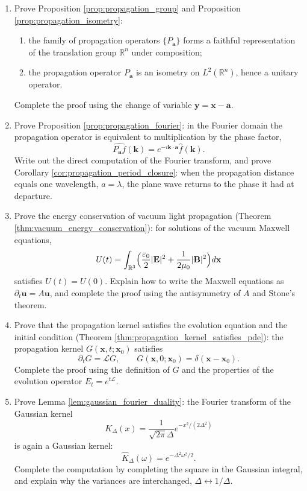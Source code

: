 \begin{enumerate}[leftmargin=3em, label=\textbf{Exercise \arabic*}]
    \item Prove Proposition \ref{prop:propagation_group} and Proposition \ref{prop:propagation_isometry}:
    \begin{enumerate}[label=(\roman*)]
        \item the family of propagation operators $\{P_{\mathbf{a}}\}$ forms a faithful representation of the translation group $\mathbb{R}^n$ under composition;
        \item the propagation operator $P_{\mathbf{a}}$ is an isometry on $L^2(\mathbb{R}^n)$,
              hence a unitary operator.
    \end{enumerate}
    Complete the proof using the change of variable $\mathbf{y}=\mathbf{x}-\mathbf{a}$.

    \item Prove Proposition \ref{prop:propagation_fourier}:
    in the Fourier domain the propagation operator is equivalent to multiplication by the phase factor,
    \[
    \widehat{P_{\mathbf{a}}f}(\mathbf{k})=e^{-i\mathbf{k}\cdot\mathbf{a}}\hat{f}(\mathbf{k}).
    \]
    Write out the direct computation of the Fourier transform,
    and prove Corollary \ref{cor:propagation_period_closure}:
    when the propagation distance equals one wavelength, $a=\lambda$, the plane wave returns to the phase it had at departure.

    \item Prove the energy conservation of vacuum light propagation (Theorem \ref{thm:vacuum_energy_conservation}):
    for solutions of the vacuum Maxwell equations,
    \[
    U(t)=\int_{\mathbb{R}^3}\Bigl(\frac{\varepsilon_0}{2}|\mathbf{E}|^2
    +\frac{1}{2\mu_0}|\mathbf{B}|^2\Bigr)d\mathbf{x}
    \]
    satisfies $U(t)=U(0)$.
    Explain how to write the Maxwell equations as $\partial_t\mathbf{u}=A\mathbf{u}$,
    and complete the proof using the antisymmetry of $A$ and Stone's theorem.

    \item Prove that the propagation kernel satisfies the evolution equation and the initial condition (Theorem \ref{thm:propagation_kernel_satisfies_pde}):
    the propagation kernel $G(\mathbf{x},t;\mathbf{x}_0)$ satisfies
    \[
    \partial_tG=\mathcal{L}G,\qquad
    G(\mathbf{x},0;\mathbf{x}_0)=\delta(\mathbf{x}-\mathbf{x}_0).
    \]
    Complete the proof using the definition of $G$ and the properties of the evolution operator $E_t=e^{t\mathcal{L}}$.

    \item Prove Lemma \ref{lem:gaussian_fourier_duality}:
    the Fourier transform of the Gaussian kernel
    \[
    K_\Delta(x)=\frac{1}{\sqrt{2\pi}\Delta}e^{-x^2/(2\Delta^2)}
    \]
    is again a Gaussian kernel:
    \[
    \hat{K}_\Delta(\omega)=e^{-\Delta^2\omega^2/2}.
    \]
    Complete the computation by completing the square in the Gaussian integral,
    and explain why the variances are interchanged, $\Delta\leftrightarrow1/\Delta$.


\end{enumerate}
